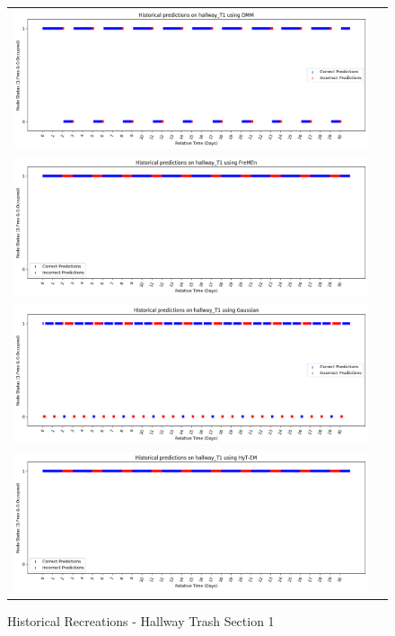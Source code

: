 \begin{figure}[!Hp]
  \begin{tabular}{cc}
    {\includegraphics[width = 6in]{images/results/Historical_hallway_T1_DMM.png}} \\
    {\includegraphics[width = 6in]{images/results/Historical_hallway_T1_FreMEn.png}} \\
    {\includegraphics[width = 6in]{images/results/Historical_hallway_T1_Gaussian.png}} \\
    {\includegraphics[width = 6in]{images/results/Historical_hallway_T1_HyT-EM.png}} \\
  \end{tabular}
  \caption{Historical Recreations - Hallway Trash Section 1}
\end{figure}

